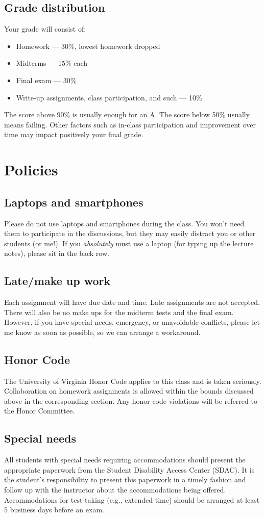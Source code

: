 \documentclass[oneside,11pt]{amsart}
\begin{document}
\subsection{Grade distribution}

Your grade will consist of:
\begin{itemize}
	\item Homework --- 30\%, lowest homework dropped
	\item Midterms --- 15\% each
	\item Final exam --- 30\%
	\item Write-up assignments, class participation, and such --- 10\%
\end{itemize}
The score above 90\% is usually enough for an A. 
The score below 50\% usually means failing. 
Other factors such as in-class participation 
and improvement over time may impact positively your final grade.

\section{Policies}

\subsection{Laptops and smartphones}

Please do not use laptops and smartphones during the class.
You won't need them to participate in the discussions, but they may easily distract 
you or other students (or me!). If you \emph{absolutely} must use a laptop
(for typing up the lecture notes), please sit in the back row.

\subsection{Late/make up work} Each assignment will have due date and time.
Late assignments are not accepted. There will also be no make ups for the midterm tests and the final exam.
However, if you have special needs, emergency, or unavoidable conflicts, please
let me know as soon as possible, so we can arrange a workaround.

\subsection{Honor Code} The University of Virginia Honor Code applies to this
class and is taken seriously. Collaboration on homework
assignments is allowed within the bounds discussed above 
in the corresponding section.
Any honor code violations will be referred to the
Honor Committee.

\subsection{Special needs}

All students with special needs requiring accommodations should present the
appropriate paperwork from the Student Disability Access Center (SDAC). It is
the student's responsibility to present this paperwork in a timely fashion and
follow up with the instructor about the accommodations being offered.
Accommodations for test-taking (e.g., extended time) should be arranged at
least 5 business days before an exam.
\end{document}
